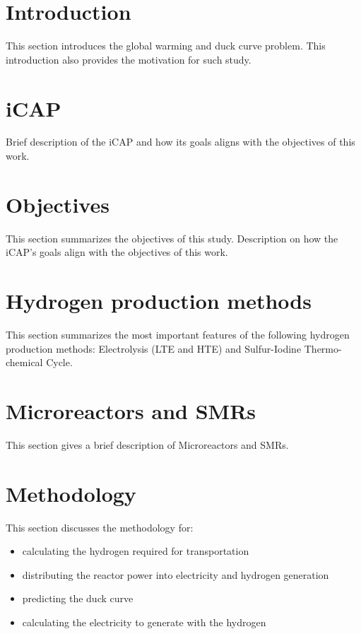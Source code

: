 \section{Introduction}

This section introduces the global warming and duck curve problem.
This introduction also provides the motivation for such study.

\section{iCAP}

Brief description of the iCAP and how its goals aligns with the objectives of this work.

\section{Objectives}

This section summarizes the objectives of this study.
Description on how the iCAP's goals align with the objectives of this work.

\section{Hydrogen production methods}

This section summarizes the most important features of the following hydrogen production methods: Electrolysis (LTE and HTE) and Sulfur-Iodine Thermo-chemical Cycle.

\section{Microreactors and SMRs}

This section gives a brief description of Microreactors and SMRs.

\section{Methodology}

This section discusses the methodology for:
\begin{itemize}
\item calculating the hydrogen required for transportation
\item distributing the reactor power into electricity and hydrogen generation
\item predicting the duck curve
\item calculating the electricity to generate with the hydrogen
\end{itemize}



